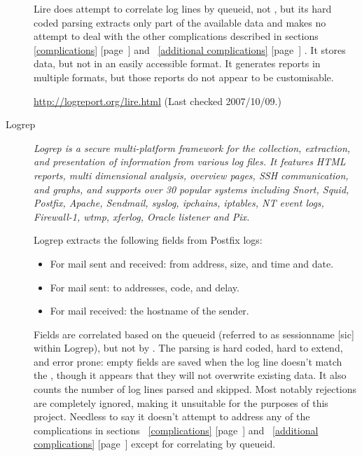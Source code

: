 \documentclass[a4paper,12pt,draft]{article}
\newcommand{\refwithpage}[1]{%
    \empty{}\ref{#1} [page~\pageref{#1}]%
}
\begin{document}
\begin{description}
        Lire does attempt to correlate log lines by queueid, not \pid{},
        but its hard coded parsing extracts only part of the available data
        and makes no attempt to deal with the other complications described
        in sections~\refwithpage{complications} and~\refwithpage{additional
        complications}.  It stores data, but not in an easily accessible
        format.  It generates reports in multiple formats, but those
        reports do not appear to be customisable.

        \url{http://logreport.org/lire.html} \newline (Last checked
        2007/10/09.)

    \item [Logrep] \textit{Logrep is a secure multi-platform framework for
        the collection, extraction, and presentation of information from
        various log files. It features HTML reports, multi dimensional
        analysis, overview pages, SSH communication, and graphs, and
        supports over 30 popular systems including Snort, Squid, Postfix,
        Apache, Sendmail, syslog, ipchains, iptables, NT event logs,
        Firewall-1, wtmp, xferlog, Oracle listener and Pix.\/}

        Logrep extracts the following fields from Postfix logs:

        \begin{itemize}

            \item For mail sent and received: from address, size, and time
                and date.

            \item For mail sent: to addresses, \SMTP{} code, and delay.

            \item For mail received: the hostname of the sender.

        \end{itemize}

        Fields are correlated based on the queueid (referred to as
        sessionname [sic] within Logrep), but not by \pid{}.  The parsing
        is hard coded, hard to extend, and error prone: empty fields are
        saved when the log line doesn't match the \regex{}, though it
        appears that they will not overwrite existing data.  It also counts
        the number of log lines parsed and skipped.  Most notably
        rejections are completely ignored, making it unsuitable for the
        purposes of this project.  Needless to say it doesn't attempt to
        address any of the complications in
        sections~\refwithpage{complications} and~\refwithpage{additional
        complications} except for correlating by queueid.


\end{description}
\end{document}
